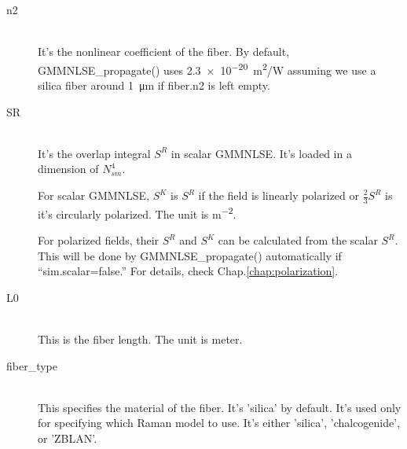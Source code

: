 \documentclass[12pt,hidelinks]{book}
\begin{document}
\begin{description}
\item[\color{blue}n2]\mbox{}\\
It's the nonlinear coefficient of the fiber. By default, GMMNLSE\_propagate() uses \SI{2.3e-20}{m^2/W} assuming we use a silica fiber around \SI{1}{\um} if fiber.n2 is left empty.

\item[\color{blue}SR]\mbox{}\\
It's the overlap integral $S^R$ in scalar GMMNLSE. It's loaded in a dimension of $N_{sm}^4$.

For scalar GMMNLSE, $S^K$ is $S^R$ if the field is linearly polarized or $\frac{2}{3}S^R$ is it's circularly polarized. The unit is \si{m^{-2}}.

For polarized fields, their $S^R$ and $S^K$ can be calculated from the scalar $S^R$. This will be done by GMMNLSE\_propagate() automatically if ``sim.scalar=false.'' For details, check Chap.\ref{chap:polarization}.

\item[\color{blue}L0]\mbox{}\\
This is the fiber length. The unit is meter.

\item[\color{blue}fiber\_type]\mbox{}\\
This specifies the material of the fiber. It's 'silica' by default. It's used only for specifying which Raman model to use. It's either 'silica', 'chalcogenide', or 'ZBLAN'.
\end{description}
\end{document}
